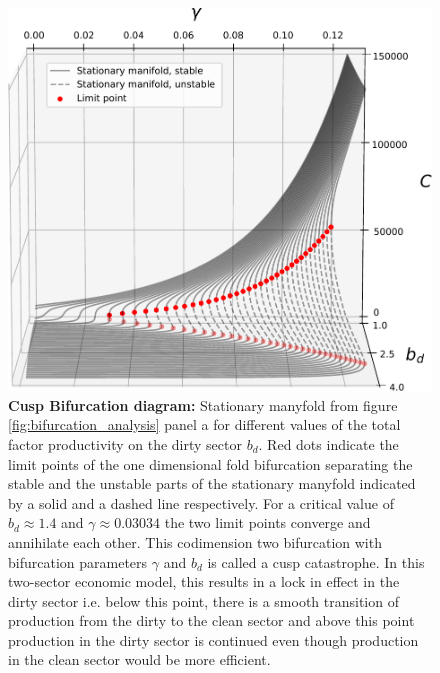 \begin{figure}[ht!]
\centering\includegraphics[width=\linewidth]{figures/cusp_better.pdf}
\caption{\textbf{Cusp Bifurcation diagram:}
Stationary manyfold from figure \ref{fig:bifurcation_analysis} panel a for different values of the total factor productivity on the dirty sector $b_d$. Red dots indicate the limit points of the one dimensional fold bifurcation separating the stable and the unstable parts of the stationary manyfold indicated by a solid and a dashed line respectively. For a critical value of $b_d \approx 1.4$ and $\gamma \approx 0.03034$ the two limit points converge and annihilate each other. This codimension two bifurcation with bifurcation parameters $\gamma$ and $b_d$ is called a cusp catastrophe. In this two-sector economic model, this results in a lock in effect in the dirty sector i.e. below this point, there is a smooth transition of production from the dirty to the clean sector and above this point production in the dirty sector is continued even though production in the clean sector would be more efficient. \label{fig:cusp}}
\end{figure}

